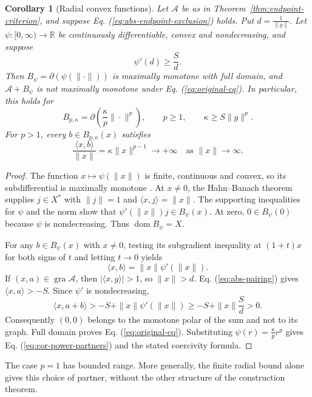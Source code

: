 \documentclass[11pt]{article}
\newcommand{\R}{\mathbb R}
\newcommand{\gra}{\operatorname{gra}}
\newcommand{\dom}{\operatorname{dom}}
\newcommand{\pair}[2]{\langle #1,#2\rangle}
\newtheorem{corollary}{Corollary}
\theoremstyle{definition}
\theoremstyle{remark}
\begin{document}
\begin{corollary}[Radial convex functions]
\label{cor:radial-partners}
Let $\mathcal A$ be as in Theorem~\ref{thm:endpoint-criterion}, and suppose Eq. (\ref{eq:abs-endpoint-exclusion}) holds. Put $d=\frac1{\|g\|}$. Let $\psi:[0,\infty)\to\R$ be continuously differentiable, convex and nondecreasing, and suppose
\[
\psi'(d)\ge\frac{S}{d}.
\]
Then $B_\psi=\partial(\psi(\|\cdot\|))$ is maximally monotone with full domain, and $\mathcal A+B_\psi$ is not maximally monotone under Eq. (\ref{eq:original-cq}). In particular, this holds for
\begin{equation}
B_{p,\kappa}=\partial\left(\frac{\kappa}{p}\|\cdot\|^p\right),
\qquad p\ge1,\qquad \kappa\ge S\|g\|^p.
\label{eq:cor-power-partners}
\end{equation}
For $p>1$, every $b\in B_{p,\kappa}(x)$ satisfies
\[
\frac{\pair{x}{b}}{\|x\|}=\kappa\|x\|^{p-1}\longrightarrow+\infty
\quad\text{as }\|x\|\to\infty.
\]
\end{corollary}
\begin{proof}
The function $x\mapsto\psi(\|x\|)$ is finite, continuous and convex, so its subdifferential is maximally monotone \cite{rockafellar1970subdiff}. At $x\ne0$, the Hahn--Banach theorem supplies $j\in X^*$ with $\|j\|=1$ and $\pair{x}{j}=\|x\|$. The supporting inequalities for $\psi$ and the norm show that $\psi'(\|x\|)j\in B_\psi(x)$. At zero, $0\in B_\psi(0)$ because $\psi$ is nondecreasing. Thus $\dom B_\psi=X$.

For any $b\in B_\psi(x)$ with $x\ne0$, testing its subgradient inequality at $(1+t)x$ for both signs of $t$ and letting $t\to0$ yields
\[
\pair{x}{b}=\|x\|\psi'(\|x\|).
\]
If $(x,a)\in\gra\mathcal A$, then $|\pair{x}{g}|>1$, so $\|x\|>d$. Eq. (\ref{eq:abs-pairing}) gives $\pair{x}{a}>-S$. Since $\psi'$ is nondecreasing,
\[
\pair{x}{a+b}>-S+\|x\|\psi'(\|x\|)
\ge-S+\|x\|\frac{S}{d}>0.
\]
Consequently $(0,0)$ belongs to the monotone polar of the sum and not to its graph. Full domain proves Eq. (\ref{eq:original-cq}). Substituting $\psi(r)=\frac{\kappa}{p}r^p$ gives Eq. (\ref{eq:cor-power-partners}) and the stated coercivity formula.
\end{proof}

The case $p=1$ has bounded range. More generally, the finite radial bound alone gives this choice of partner, without the other structure of the construction theorem.
\end{document}
